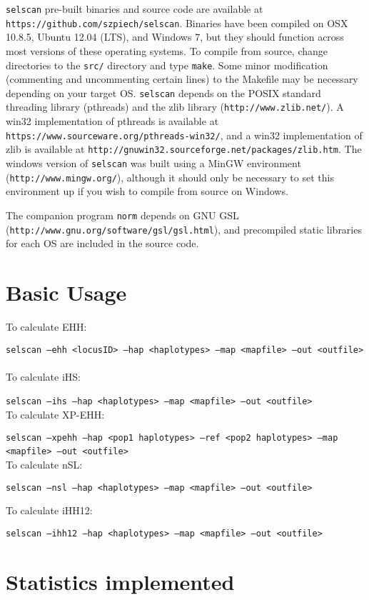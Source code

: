 \documentclass[12pt]{article}%
\begin{document}
{\tt selscan} pre-built binaries and source code are available at {\tt https://github.com/szpiech/selscan}.  Binaries have been compiled on OSX 10.8.5, Ubuntu 12.04 (LTS), and Windows 7, but they should function across most versions of these operating systems.  To compile from source, change directories to the {\tt src/} directory and type {\tt make}.  Some minor modification (commenting and uncommenting certain lines) to the Makefile may be necessary depending on your target OS.  {\tt selscan} depends on the POSIX standard threading library (pthreads) and the zlib library ({\tt http://www.zlib.net/}). A win32 implementation of pthreads is available at {\tt https://www.sourceware.org/pthreads-win32/}, and a win32 implementation of zlib is available at {\tt http://gnuwin32.sourceforge.net/packages/zlib.htm}.  The windows version of {\tt selscan} was built using a MinGW environment ({\tt http://www.mingw.org/}), although it should only be necessary to set this environment up if you wish to compile from source on Windows.

The companion program {\tt norm} depends on GNU GSL ({\tt http://www.gnu.org/software/gsl/gsl.html}), and precompiled static libraries for each OS are included in the source code.

\section{Basic Usage}

To calculate EHH:

{\tt selscan --ehh <locusID> --hap <haplotypes> --map <mapfile> --out <outfile>}
~\\
\noindent To calculate iHS:

{\tt selscan --ihs --hap <haplotypes> --map <mapfile> --out <outfile>}
~\\
\noindent To calculate XP-EHH:

{\tt selscan --xpehh --hap <pop1 haplotypes> --ref <pop2 haplotypes> --map <mapfile> --out <outfile>}
~\\
\noindent To calculate nSL:

{\tt selscan --nsl --hap <haplotypes> --map <mapfile> --out <outfile>}

\noindent To calculate iHH12:

{\tt selscan --ihh12 --hap <haplotypes> --map <mapfile> --out <outfile>}


\section{Statistics implemented}
\end{document}
